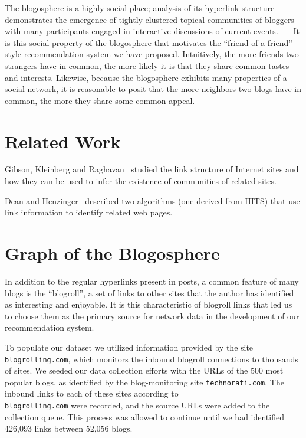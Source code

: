 \documentclass{sig-alternate-nocopyright}
\begin{document}
%
The blogosphere is a highly social place; analysis of its
hyperlink structure demonstrates the emergence of tightly-clustered
topical communities of bloggers with many participants engaged in
interactive discussions of current events.~\cite{adamic}~\cite{convBlog}~\cite{commBlog} It is this social property
of the blogosphere that motivates the
``friend-of-a-friend''-style recommendation system we
have proposed. Intuitively, the more friends two strangers have in
common, the more likely it is that they share common tastes and
interests.  Likewise, because the blogosphere exhibits many properties
of a social network, it is reasonable to posit that the more neighbors
two blogs have in common, the more they share some common appeal.

\section{Related Work}

Gibson, Kleinberg and Raghavan~\cite{gibson1998iwc} studied the link
structure of Internet sites and how they can be used to infer the
existence of communities of related sites.

Dean and Henzinger~\cite{dean1999frp} described two algorithms (one
derived from HITS) that use link information to identify related web
pages.

\section{Graph of the Blogosphere}
In addition to the regular hyperlinks present in posts, a common
feature of many blogs is the ``blogroll'', a set of
links to other sites that the author has identified as interesting and
enjoyable.  It is this characteristic of blogroll links
that led us to choose them as the primary source for network data in
the development of our recommendation system.

To populate our dataset we utilized information provided by the site
\texttt{blogrolling.com}, which monitors the inbound blogroll
connections to thousands of sites.  We seeded our data collection
efforts with the URLs of the 500 most popular blogs, as identified by
the blog-monitoring site  \texttt{technorati.com}.  The inbound links to each of
these sites according to \\ \texttt{blogrolling.com} were recorded, and the source
URLs were added to the collection queue.  This process was allowed to
continue until we had identified 426,093 links between 52,056 blogs.
\end{document}
